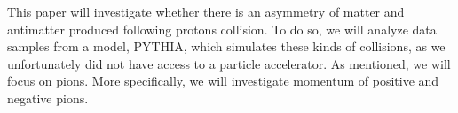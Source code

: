 This paper will investigate whether there is an asymmetry of matter and antimatter produced following protons collision. To do so, we will analyze data samples from a model, PYTHIA, which simulates these kinds of collisions, as we unfortunately did not have access to a particle accelerator. As mentioned, we will focus on pions. More specifically, we will investigate momentum of positive and negative pions. 


